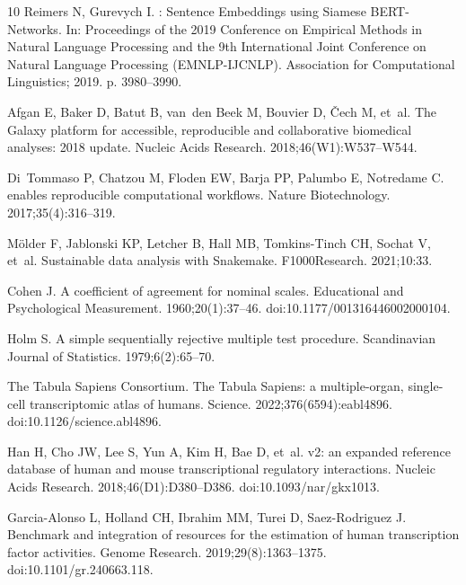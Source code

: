 \documentclass[10pt,letterpaper]{article}
\begin{document}
\begin{thebibliography}{10}
Reimers N, Gurevych I.
: Sentence Embeddings using {Siamese} {BERT}-Networks.
\newblock In: Proceedings of the 2019 Conference on Empirical Methods in
  Natural Language Processing and the 9th International Joint Conference on
  Natural Language Processing (EMNLP-IJCNLP). Association for Computational
  Linguistics; 2019. p. 3980--3990.

Afgan E, Baker D, Batut B, van~den Beek M, Bouvier D, {\v{C}}ech M, et~al.
\newblock The {Galaxy} platform for accessible, reproducible and collaborative
  biomedical analyses: 2018 update.
\newblock Nucleic Acids Research. 2018;46(W1):W537--W544.

Di~Tommaso P, Chatzou M, Floden EW, Barja PP, Palumbo E, Notredame C.
 enables reproducible computational workflows.
\newblock Nature Biotechnology. 2017;35(4):316--319.

M{\"o}lder F, Jablonski KP, Letcher B, Hall MB, Tomkins-Tinch CH, Sochat V,
  et~al.
\newblock Sustainable data analysis with {Snakemake}.
\newblock F1000Research. 2021;10:33.

Cohen J.
\newblock A coefficient of agreement for nominal scales.
\newblock Educational and Psychological Measurement. 1960;20(1):37--46.
\newblock doi:{10.1177/001316446002000104}.

Holm S.
\newblock A simple sequentially rejective multiple test procedure.
\newblock Scandinavian Journal of Statistics. 1979;6(2):65--70.

{The Tabula Sapiens Consortium}.
\newblock The {Tabula Sapiens}: a multiple-organ, single-cell transcriptomic
  atlas of humans.
\newblock Science. 2022;376(6594):eabl4896.
\newblock doi:{10.1126/science.abl4896}.

Han H, Cho JW, Lee S, Yun A, Kim H, Bae D, et~al.
 v2: an expanded reference database of human and mouse
  transcriptional regulatory interactions.
\newblock Nucleic Acids Research. 2018;46(D1):D380--D386.
\newblock doi:{10.1093/nar/gkx1013}.

Garcia-Alonso L, Holland CH, Ibrahim MM, Turei D, Saez-Rodriguez J.
\newblock Benchmark and integration of resources for the estimation of human
  transcription factor activities.
\newblock Genome Research. 2019;29(8):1363--1375.
\newblock doi:{10.1101/gr.240663.118}.


\end{thebibliography}
\end{document}

